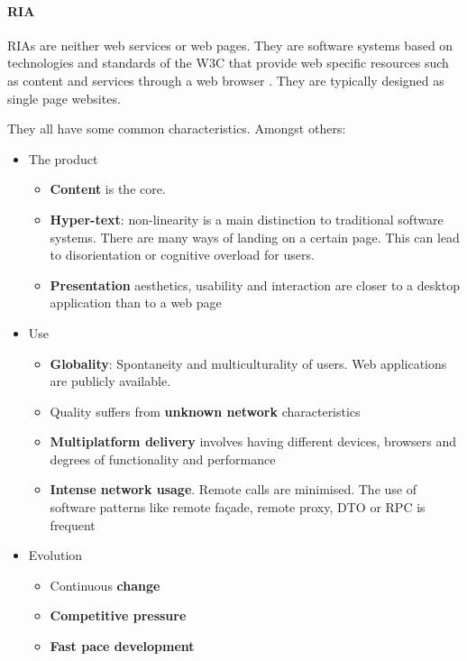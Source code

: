 \paragraph{\ac{RIA}}
\acp{RIA} are neither web services or web pages. 
They are software systems based on technologies and standards of the \ac{W3C} that provide web specific resources such as content and services through a web browser \cite{Kappel:2006}.
They are typically designed as single page websites.

They all have some common characteristics. 
Amongst others:
\begin{itemize}
    \item The product
    \begin{itemize}
        \item \textbf{Content} is the core.
        \item \textbf{Hyper-text}: non-linearity is a main distinction to traditional software systems. There are many ways of landing on a certain page. This can lead to disorientation or cognitive overload for users.
        \item \textbf{Presentation} aesthetics, usability and interaction are closer to a desktop application than to a web page
    \end{itemize}
    \item Use
    \begin{itemize}
        \item \textbf{Globality}: Spontaneity and multiculturality of users. Web applications are publicly available.
        \item Quality suffers from \textbf{unknown network} characteristics
        \item \textbf{Multiplatform delivery} involves having different devices, browsers and degrees of functionality and performance
        \item \textbf{Intense network usage}. Remote calls are minimised. The use of software patterns like remote fa\c{c}ade, remote proxy, \ac{DTO} or \ac{RPC} is frequent
    \end{itemize}
    \item Evolution
    \begin{itemize}
         \item Continuous \textbf{change}
         \item \textbf{Competitive pressure}
         \item \textbf{Fast pace development}
    \end{itemize}   
\end{itemize}

